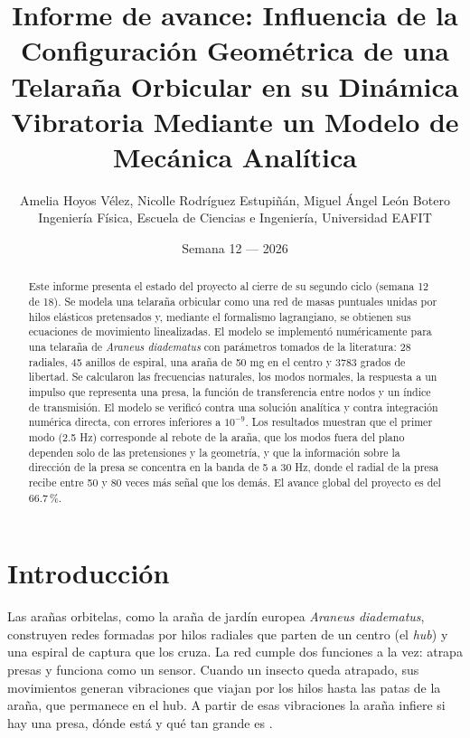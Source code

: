\documentclass[11pt,letterpaper]{article}
\title{\textbf{\LARGE Informe de avance: Influencia de la Configuración Geométrica
de una Telaraña Orbicular en su Dinámica Vibratoria
Mediante un Modelo de Mecánica Analítica}}
\author{Amelia Hoyos Vélez, Nicolle Rodríguez Estupiñán, Miguel Ángel León Botero\\[0.3cm]
\small Ingeniería Física, Escuela de Ciencias e Ingeniería, Universidad EAFIT}
\date{Semana 12 --- 2026}
\begin{document}
\maketitle

\begin{abstract}
Este informe presenta el estado del proyecto al cierre de su segundo ciclo
(semana 12 de 18). Se modela una telaraña orbicular como una red de masas
puntuales unidas por hilos elásticos pretensados y, mediante el formalismo
lagrangiano, se obtienen sus ecuaciones de movimiento linealizadas. El modelo
se implementó numéricamente para una telaraña de \textit{Araneus
diadematus} con parámetros tomados de la literatura: 28 radiales, 45 anillos
de espiral, una araña de 50 mg en el centro y 3783 grados de libertad. Se
calcularon las frecuencias naturales, los modos normales, la respuesta a un
impulso que representa una presa, la función de transferencia entre nodos y
un índice de transmisión. El modelo se verificó contra una solución
analítica y contra integración numérica directa, con errores inferiores a
$10^{-9}$. Los resultados muestran que el primer modo (2.5 Hz) corresponde al
rebote de la araña, que los modos fuera del plano dependen solo de las
pretensiones y la geometría, y que la información sobre la dirección de la
presa se concentra en la banda de 5 a 30 Hz, donde el radial de la presa
recibe entre 50 y 80 veces más señal que los demás. El avance global del
proyecto es del 66.7\,\%.
\end{abstract}

\section{Introducción}

Las arañas orbitelas, como la araña de jardín europea \textit{Araneus
diadematus}, construyen redes formadas por hilos radiales que parten de un
centro (el \emph{hub}) y una espiral de captura que los cruza. La red cumple
dos funciones a la vez: atrapa presas y funciona como un sensor. Cuando un
insecto queda atrapado, sus movimientos generan vibraciones que viajan por
los hilos hasta las patas de la araña, que permanece en el hub. A partir de
esas vibraciones la araña infiere si hay una presa, dónde está y qué tan
grande es \cite{masters1981,mortimer2016,mortimer2019decoding}.
\end{document}
